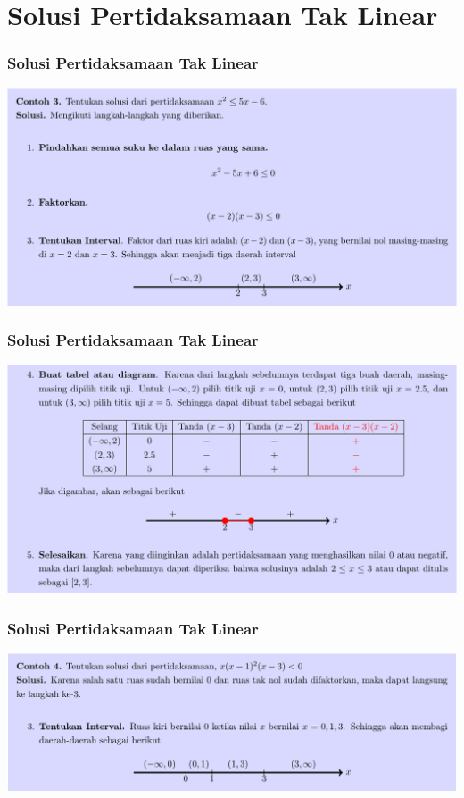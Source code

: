 \documentclass[pdflatex,compress,mathserif]{beamer}
\begin{document}
\section{Solusi Pertidaksamaan Tak Linear}

\begin{frame}
	\frametitle{Solusi Pertidaksamaan Tak Linear}
	\begin{center}
		\includegraphics[width=\linewidth]{img/img07}
	\end{center}
\end{frame}

\begin{frame}
	\frametitle{Solusi Pertidaksamaan Tak Linear}
	\begin{center}
		\includegraphics[width=\linewidth]{img/img08}
	\end{center}
\end{frame}

\begin{frame}
	\frametitle{Solusi Pertidaksamaan Tak Linear}
	\begin{center}
		\includegraphics[width=\linewidth]{img/img09}
	\end{center}
\end{frame}
\end{document}
